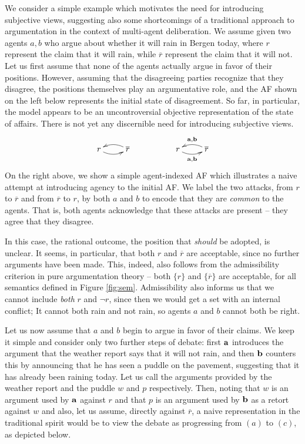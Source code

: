 \documentclass[greybox]{svmult}
\renewcommand{\bar}[1]{\overline{#1}}
\begin{document}
We consider a simple example which motivates the need for introducing subjective views, suggesting also some shortcomings of a traditional approach to argumentation in the context of multi-agent deliberation. We assume given two agents $a,b$ who argue about whether it will rain in Bergen today, where $r$ represent the claim that it will rain, while $\overline r$ represent the claim that it will not. Let us first assume that none of the agents actually argue in favor of their positions. However, assuming that the disagreeing parties recognize that they disagree, the positions themselves play an argumentative role, and the AF shown on the left below represents the initial state of disagreement. So far, in particular, the model appears to be an uncontroversial objective representation of the state of affairs. There is not yet any discernible need for introducing subjective views. 
$$
\begin{array}{ccc}
\xymatrix{ r \ar@/_/[r] & \overline r \ar@/_/[l] } & \hspace{3em} &
\xymatrix{ r \ar@/_/[r]_{{\bf a},{\bf b}} & \bar r \ar@/_/[l]_{{\bf a},{\bf b}} }
\end{array}
$$
On the right above, we show a simple agent-indexed AF which illustrates a naive attempt at introducing agency to the initial AF. We label the two attacks, from $r$ to $\overline r$ and from $\overline r$ to $r$, by both $a$ and $b$ to encode that they are \emph{common} to the agents. That is, both agents acknowledge that these attacks are present -- they agree that they disagree.

In this case, the rational outcome, the position that \emph{should} be adopted, is unclear. It seems, in particular, that both $r$ and $\bar r$ are acceptable, since no further arguments have been made. This, indeed, also follows from the admissibility criterion in pure argumentation theory -- both $\{r\}$ and $\{\bar r\}$ are acceptable, for all semantics defined in Figure \ref{fig:sem}. Admissibility also informs us that we cannot include \emph{both} $r$ and $\neg r$, since then we would get a set with an internal conflict; It cannot both rain and not rain, so agents $a$ and $b$ cannot both be right.

Let us now assume that $a$ and $b$ begin to argue in favor of their claims. We keep it simple and consider only two further steps of debate: first ${\bf a}$ introduces the argument that the weather report says that it will not rain, and then ${\bf b}$ counters this by announcing that he has seen a puddle on the pavement, suggesting that it has already been raining today. Let us call the arguments provided by the weather report and the puddle $w$ and $p$ respectively. Then, noting that $w$ is an argument used by ${\bf a}$ against $r$ and that $p$ is an argument used by ${\bf b}$ as a retort against $w$ and also, let us assume, directly against $\bar r$, a naive representation in the traditional spirit would be to view the debate as progressing from $(a)$ to $(c)$, as depicted below.
\end{document}
